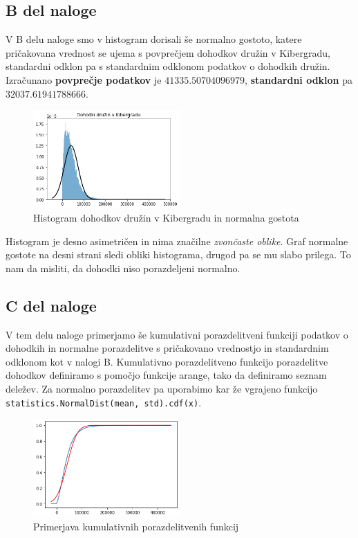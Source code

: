 \documentclass{article}
\begin{document}
\subsection{B del naloge}

V B delu naloge smo v histogram dorisali še normalno gostoto, katere pričakovana vrednost se ujema s povprečjem
dohodkov družin v Kibergradu, standardni odklon pa s standardnim odklonom podatkov o dohodkih družin.
Izračunano \textbf{povprečje podatkov} je $41335.50704096979$, \textbf{standardni odklon} pa $32037.61941788666$.

\begin{figure}[H]
    \begin{center}
        \includegraphics*[width=0.5\textwidth]{figure1B.png}
        \caption{Histogram dohodkov družin v Kibergradu in normalna gostota}
        \label{1B}
    \end{center}
\end{figure}

Histogram je desno asimetričen in nima značilne \textit{zvončaste oblike}. 
Graf normalne gostote na desni strani sledi obliki histograma, drugod pa se mu slabo prilega.
To nam da misliti, da dohodki niso porazdeljeni normalno.


\subsection{C del naloge}
V tem delu naloge primerjamo še kumulativni porazdelitveni funkciji podatkov o dohodkih in 
normalne porazdelitve s pričakovano vrednostjo in standardnim odklonom kot v nalogi B.
Kumulativno porazdelitveno funkcijo porazdelitve dohodkov definiramo s pomočjo
funkcije arange, tako da definiramo seznam deležev. Za normalno porazdelitev pa uporabimo kar že vgrajeno funkcijo
\texttt{statistics.NormalDist(mean, std).cdf(x)}.
\begin{figure}[H]
    \begin{center}
        \includegraphics*[width=0.5\textwidth]{figure1C.png}
        \caption{Primerjava kumulativnih porazdelitvenih funkcij}
        \label{kumulativne}
    \end{center}
\end{figure}
\end{document}
